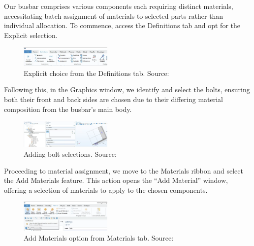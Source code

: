 Our busbar comprises various components each requiring distinct materials, necessitating batch assignment of materials to selected parts rather than individual allocation. To commence, access the Definitions tab and opt for the Explicit selection.

\begin{figure}[ht!]
  \centering
  \includegraphics[width=0.4\textwidth]{Chapters/Figures/Chapter 3 Figures/Explicit Choice Selection from Definitions Tab.png}
  \caption{Explicit choice from the Definitions tab. Source: \cite{multiphysics__modeling_nodate}}
  \label{fig:Explicit choice from the Definitions tab.}
\end{figure}

Following this, in the Graphics window, we identify and select the bolts, ensuring both their front and back sides are chosen due to their differing material composition from the busbar's main body.

\begin{figure}[ht!]
  \centering
  \includegraphics[width=0.4\textwidth]{Chapters/Figures/Chapter 3 Figures/Bolts Selection.png}
  \caption{Adding bolt selections. Source: \cite{multiphysics__modeling_nodate}}
  \label{fig:Adding bolt selections}
\end{figure}

Proceeding to material assignment, we move to the Materials ribbon and select the Add Materials feature. This action opens the ``Add Material'' window, offering a selection of materials to apply to the chosen components.

\begin{figure}[ht!]
  \centering
  \includegraphics[width=0.4\textwidth]{Chapters/Figures/Chapter 3 Figures/Add Material Button.png}
  \caption{Add Materials option from Materials tab. Source: \cite{multiphysics__modeling_nodate}}
  \label{fig:Add Materials option from Materials tab.}
\end{figure}

